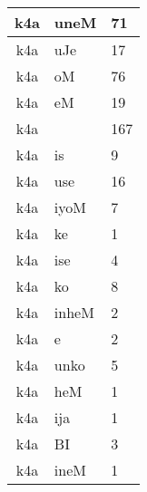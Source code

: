\documentclass[a4 paper]{article}
\begin{document}
\begin{longtable}{cp{}p{}}
k4a & uneM & 71\\ \midrule k4a & uJe & 17\\ \midrule k4a & oM & 76\\ \midrule k4a & eM & 19\\ \midrule k4a &  & 167\\ \midrule k4a & is & 9\\ \midrule k4a & use & 16\\ \midrule k4a & iyoM & 7\\ \midrule k4a & ke & 1\\ \midrule k4a & ise & 4\\ \midrule k4a & ko & 8\\ \midrule k4a & inheM & 2\\ \midrule k4a & e & 2\\ \midrule k4a & unko & 5\\ \midrule k4a & heM & 1\\ \midrule k4a & ija & 1\\ \midrule k4a & BI & 3\\ \midrule k4a & ineM & 1\\ \midrule 

\end{longtable}
\end{document}
